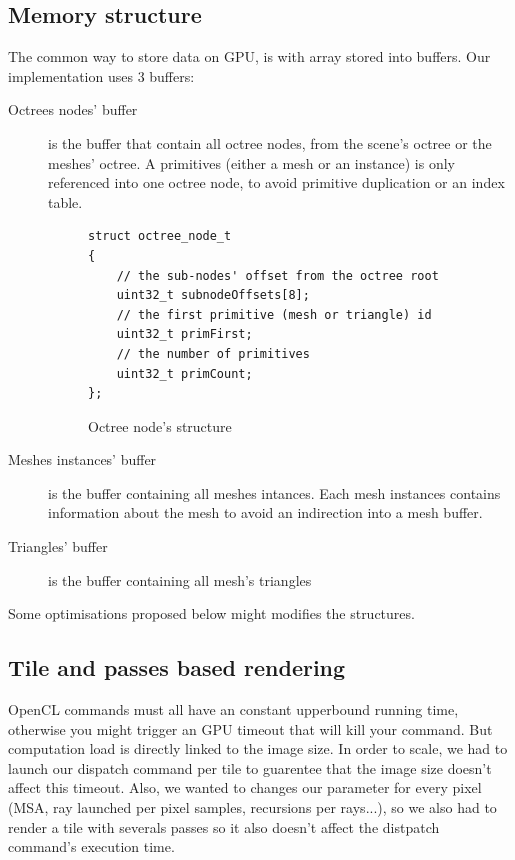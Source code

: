 \documentclass[10pt,twocolumn,a4paper]{article}
\begin{document}
\subsection{Memory structure}
The common way to store data on GPU, is with array stored into buffers.
Our implementation uses 3 buffers:
\begin{description}
    \item[Octrees nodes' buffer] is the buffer that contain all octree nodes,
        from the scene's octree or the meshes' octree. A primitives (either a
        mesh or an instance) is only referenced into one octree node, to avoid
        primitive duplication or an index table.
        \begin{figure}[H]
            \centering
            \begin{lstlisting}
struct octree_node_t
{
    // the sub-nodes' offset from the octree root
    uint32_t subnodeOffsets[8];
    // the first primitive (mesh or triangle) id
    uint32_t primFirst;
    // the number of primitives
    uint32_t primCount;
};
            \end{lstlisting}
            \caption{Octree node's structure}
            \label{code:octree_node_struct}
        \end{figure}
    \item[Meshes instances' buffer] is the buffer containing all meshes intances.
        Each mesh instances contains information about the mesh to avoid an
        indirection into a mesh buffer.
    \item[Triangles' buffer] is the buffer containing all mesh's triangles
\end{description}
Some optimisations proposed below might modifies the structures.

\subsection{Tile and passes based rendering}
OpenCL commands must all have an constant upperbound running time, otherwise
you might trigger an GPU timeout that will kill your command. But computation
load is directly linked to the image size. In order to scale, we had to launch
our dispatch command per tile to guarentee that the image size doesn't affect
this timeout. Also, we wanted to changes our parameter for every pixel (MSA,
ray launched per pixel samples, recursions per rays...), so we also had to
render a tile with severals passes so it also doesn't affect the distpatch
command's execution time.
\end{document}
